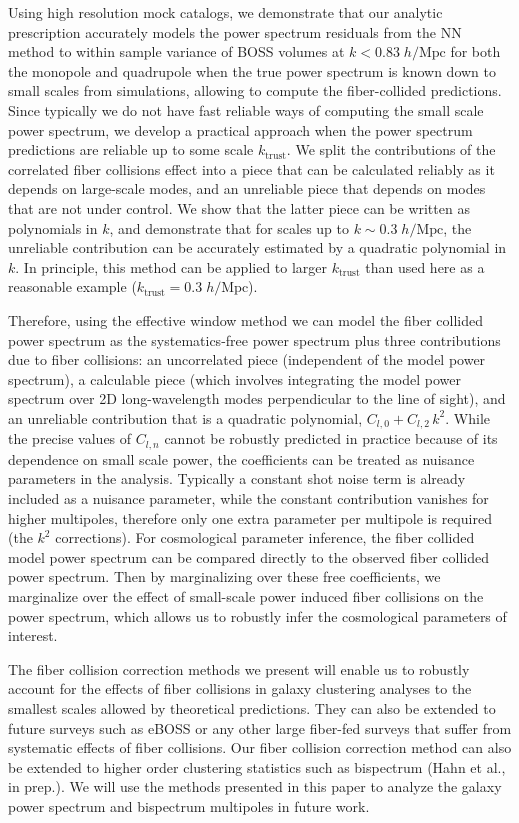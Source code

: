 Using high resolution mock catalogs, we demonstrate that our  analytic prescription 
accurately models the power spectrum residuals from the NN method to within sample variance of BOSS volumes  
at $k < 0.83\;h/\mathrm{Mpc}$ for both the monopole and quadrupole when the true power spectrum is known down to small scales from simulations, allowing to compute the fiber-collided predictions. Since typically we do not have fast reliable ways of computing the small scale power spectrum, we develop a practical approach when the power spectrum predictions are reliable up to some scale $k_\mathrm{trust}$. We split the contributions of the correlated fiber collisions effect into a  piece that can be calculated reliably as it depends on large-scale modes, and an unreliable piece that depends on modes that are not under control. We show that the latter piece can be written as polynomials in $k$, and demonstrate that for scales up to $k \sim 0.3\;h/\mathrm{Mpc}$, the unreliable contribution can be accurately estimated by a quadratic  polynomial in $k$. In principle, this method can be applied to larger $k_\mathrm{trust}$ than used here as a reasonable example ($k_\mathrm{trust} = 0.3\;h/\mathrm{Mpc}$). 

Therefore, using the effective window method we can model the fiber collided power 
spectrum as the systematics-free  power spectrum plus three contributions due to  
fiber collisions: an uncorrelated piece (independent of the model power spectrum), a calculable piece (which involves integrating the model power spectrum over 2D long-wavelength modes perpendicular to the line of sight), and an unreliable contribution that is a quadratic polynomial, $C_{l,0} + C_{l,2}\, k^2$. 
While the precise values of $C_{l, n}$ cannot be robustly predicted in practice 
because of its dependence on small scale power, the coefficients 
can be treated as nuisance parameters in the analysis. Typically a constant shot 
noise term is already included as a nuisance parameter, while the constant contribution vanishes for higher multipoles, therefore only one extra parameter 
per multipole is required (the $k^2$ corrections). For cosmological parameter inference, the fiber collided model power spectrum 
can be compared directly to the observed fiber 
collided power spectrum. Then by marginalizing over these free coefficients, we marginalize 
over the effect of small-scale power induced fiber collisions on the power spectrum, which allows us to robustly 
infer the cosmological parameters of interest.

The fiber collision correction methods we present will enable us to robustly 
account for the effects of fiber collisions in galaxy clustering analyses 
to the smallest scales allowed by theoretical predictions. They can also be extended to 
future surveys such as eBOSS  or any other large fiber-fed 
surveys that suffer from systematic effects of fiber collisions. Our fiber
collision correction method can also be extended to higher order clustering 
statistics such as bispectrum (Hahn et al., in prep.). We will use the methods 
presented in this paper to analyze the galaxy power spectrum and bispectrum 
multipoles in future work.

